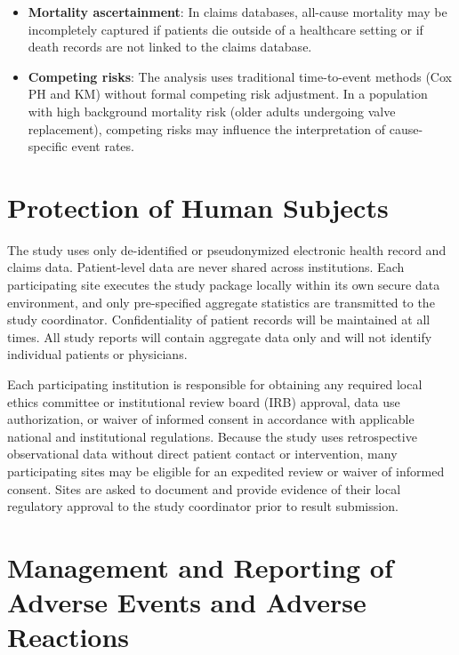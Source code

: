 \documentclass[
  12pt,
]{article}
\begin{document}
\begin{itemize}
  encouraged to validate concept coverage prior to execution.
\item
  \textbf{Mortality ascertainment}: In claims databases, all-cause
  mortality may be incompletely captured if patients die outside of a
  healthcare setting or if death records are not linked to the claims
  database.
\item
  \textbf{Competing risks}: The analysis uses traditional time-to-event
  methods (Cox PH and KM) without formal competing risk adjustment. In a
  population with high background mortality risk (older adults
  undergoing valve replacement), competing risks may influence the
  interpretation of cause-specific event rates.
\end{itemize}

\section{Protection of Human
Subjects}\label{protection-of-human-subjects}

The study uses only de-identified or pseudonymized electronic health
record and claims data. Patient-level data are never shared across
institutions. Each participating site executes the study package locally
within its own secure data environment, and only pre-specified aggregate
statistics are transmitted to the study coordinator. Confidentiality of
patient records will be maintained at all times. All study reports will
contain aggregate data only and will not identify individual patients or
physicians.

Each participating institution is responsible for obtaining any required
local ethics committee or institutional review board (IRB) approval,
data use authorization, or waiver of informed consent in accordance with
applicable national and institutional regulations. Because the study
uses retrospective observational data without direct patient contact or
intervention, many participating sites may be eligible for an expedited
review or waiver of informed consent. Sites are asked to document and
provide evidence of their local regulatory approval to the study
coordinator prior to result submission.

\section{Management and Reporting of Adverse Events and Adverse
Reactions}\label{management-and-reporting-of-adverse-events-and-adverse-reactions}
\end{document}
